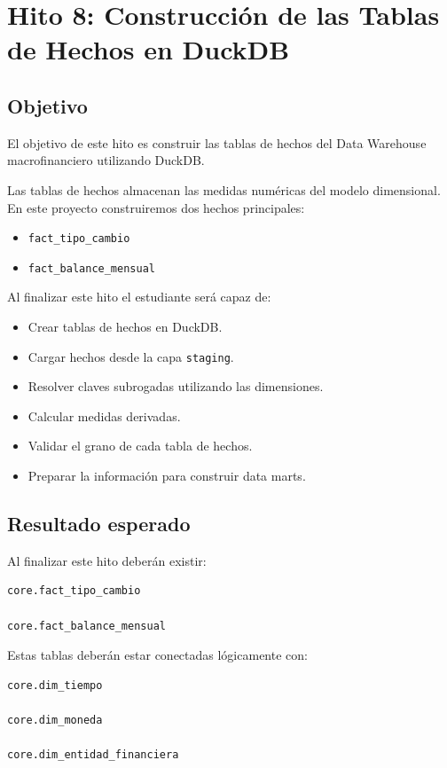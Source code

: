 \chapter{Hito 8: Construcción de las Tablas de Hechos en DuckDB}

\section{Objetivo}

El objetivo de este hito es construir las tablas de hechos del Data Warehouse macrofinanciero utilizando DuckDB.

Las tablas de hechos almacenan las medidas numéricas del modelo dimensional. En este proyecto construiremos dos hechos principales:

\begin{itemize}
\item \texttt{fact_tipo_cambio}
\item \texttt{fact_balance_mensual}
\end{itemize}

Al finalizar este hito el estudiante será capaz de:

\begin{itemize}
\item Crear tablas de hechos en DuckDB.
\item Cargar hechos desde la capa \texttt{staging}.
\item Resolver claves subrogadas utilizando las dimensiones.
\item Calcular medidas derivadas.
\item Validar el grano de cada tabla de hechos.
\item Preparar la información para construir data marts.
\end{itemize}

\section{Resultado esperado}

Al finalizar este hito deberán existir:

\begin{verbatim}
core.fact_tipo_cambio

core.fact_balance_mensual
\end{verbatim}

Estas tablas deberán estar conectadas lógicamente con:

\begin{verbatim}
core.dim_tiempo

core.dim_moneda

core.dim_entidad_financiera
\end{verbatim}

